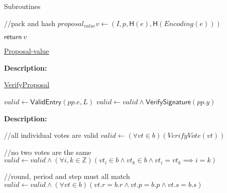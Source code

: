 \documentclass[10pt,a4paper]{article}
\begin{document}
\begin{section}{Subroutines}
\begin{algorithm}[H]\label{proposal-value}
    \begin{algorithmic}[1]

    //pack and hash
    \State $proposal_{value} v \gets (I, p, \mathsf{H}(e), \mathsf{H}(Encoding(e)))$

    \State $\mathsf{return} \ v$

    \EndFunction
    \end{algorithmic}
    \caption{\underline{Proposal-value}}
\end{algorithm}

\noindent \textbf{Description:}\\ 


\begin{algorithm}[H]
    \caption{\underline{VerifyProposal}}
    \label{algo:verify-proposal}
    \begin{algorithmic}[1]

    \State $valid \gets \mathsf{ValidEntry}(pp.e, L)$
    \State $valid \gets valid \land \mathsf{VerifySignature}(pp.y)$

    \EndFunction
    \end{algorithmic}
\end{algorithm}

\noindent \textbf{Description:}\\


\begin{algorithm}[H]\label{algo:verify-bundle}
    \begin{algorithmic}[1]

    //all individual votes are valid
    \State $valid \gets (\forall vt \in b)(VerifyVote(vt))$
    
    //no two votes are the same
    \State $valid \gets valid \land (\forall i,k \in \mathbb{Z})(vt_i \in b \land vt_k \in b \land vt_i = vt_k \implies i=k)$

    //round, period and step must all match
    \State $valid \gets valid \land (\forall vt \in b)(vt.r = b.r \land vt.p = b.p \land vt.s = b.s)$
  

\end{algorithmic}
\end{algorithm}
\end{section}
\end{document}
